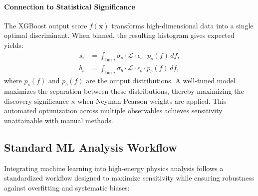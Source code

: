 \paragraph{Connection to Statistical Significance}

The XGBoost output score $f(\mathbf{x})$ transforms high-dimensional data into a single optimal discriminant. When binned, the resulting histogram gives expected yields:
\begin{align}
s_i &= \int_{\text{bin } i} \sigma_s \cdot \mathcal{L} \cdot \epsilon_s \cdot p_s(f) \, df, \\
b_i &= \int_{\text{bin } i} \sigma_b \cdot \mathcal{L} \cdot \epsilon_b \cdot p_b(f) \, df,
\end{align}
where $p_s(f)$ and $p_b(f)$ are the output distributions. A well-tuned model maximizes the separation between these distributions, thereby maximizing the discovery significance $\kappa$ when Neyman-Pearson weights are applied. This automated optimization across multiple observables achieves sensitivity unattainable with manual methods.


\subsection{Standard ML Analysis Workflow}
\label{ssec:ml_workflow}

Integrating machine learning into high-energy physics analysis follows a standardized workflow designed to maximize sensitivity while ensuring robustness against overfitting and systematic biases:

